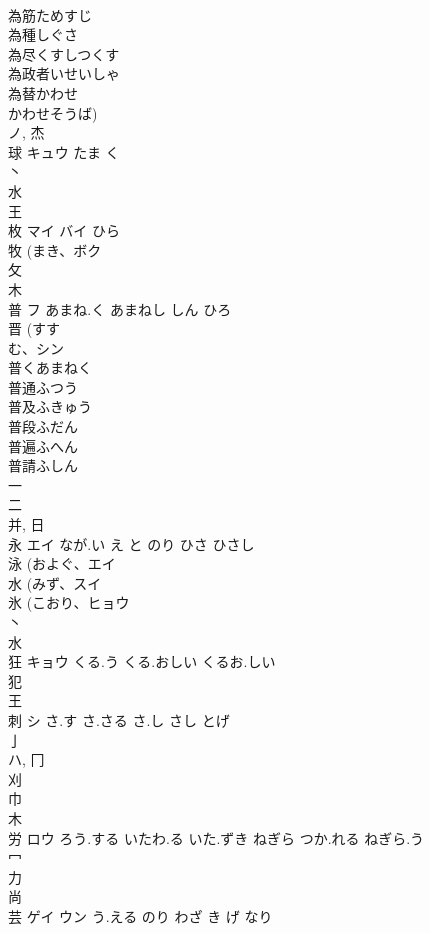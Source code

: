 \documentclass[8pt]{extreport}
\begin{document}
\begin{CJK}{UTF8}{min}
\\	為筋ためすじ 
\\	為種しぐさ 
\\	為尽くすしつくす 
\\	為政者いせいしゃ 
\\	為替かわせ 
\\	かわせそうば) 
\\	ノ, 杰	
\\	球	キュウ	たま く	
\\	丶 
\\	水 
\\	王 
\\	枚	マイ バイ	ひら	
\\	牧 (まき、ボク 
\\	攵 
\\	木 
\\	普	フ	あまね.く あまねし しん ひろ	
\\	晋 (すす
\\	む、シン 
\\	普くあまねく 
\\	普通ふつう 
\\	普及ふきゅう 
\\	普段ふだん 
\\	普遍ふへん 
\\	普請ふしん 
\\	一 
\\	二 
\\	并, 日 
\\	永	エイ	なが.い え と のり ひさ ひさし	
\\	泳 (およぐ、エイ 
\\	水 (みず、スイ 
\\	氷 (こおり、ヒョウ 
\\	丶 
\\	水 
\\	狂	キョウ	くる.う くる.おしい くるお.しい	
\\	犯 
\\	王 
\\	刺	シ	さ.す さ.さる さ.し さし とげ	
\\	亅 
\\	ハ, 冂 
\\	刈 
\\	巾 
\\	木 
\\	労	ロウ	ろう.する いたわ.る いた.ずき ねぎら つか.れる ねぎら.う	
\\	冖 
\\	力 
\\	尚 
\\	芸	ゲイ ウン	う.える のり わざ き げ なり	

\end{CJK}
\end{document}
